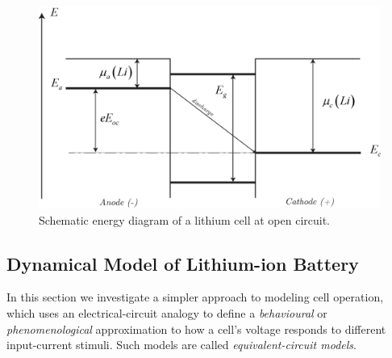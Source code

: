 \documentclass[11pt,a4paper,oneside]{book}
\numberwithin{equation}{section}
\theoremstyle{it}
\theoremstyle{definition}
\begin{document}
\begin{figure}[H]
	\centering
	\includegraphics[width = 400pt, angle = 0, keepaspectratio]{figures/lithium_ion_battery/lithium_ion_battery_1.eps}
	\captionsetup{width=0.5\textwidth, font=small}		
	\caption{Schematic energy diagram of a lithium cell at open circuit.}
	\label{litium_battery_energy}
\end{figure}


\subsection{Dynamical Model of Lithium-ion Battery}
In this section we investigate a simpler approach to modeling cell operation, which uses an electrical-circuit analogy to define a \textit{behavioural} or \textit{phenomenological} approximation to how a cell's voltage responds to different input-current stimuli. Such models are called \textit{equivalent-circuit models}.
\end{document}

